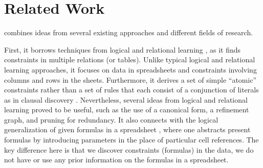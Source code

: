 \section{Related Work}\label{sec:related_work}
\sname combines ideas from several existing approaches and different fields of research.

First, it borrows techniques from logical and relational learning \cite{luc_book}, as it finds
constraints in multiple relations (or tables). Unlike typical logical and relational learning
approaches, it focuses on data in spreadsheets and constraints involving columns and rows in the sheets.
Furthermore, it derives a set of simple ``atomic'' constraints rather than a set of rules that each consist of a conjunction of literals as in clausal discovery \cite{claudien,lallouet}. Nevertheless, several ideas from logical and relational learning
proved to be useful, such as the use of a canonical form, a refinement graph, and pruning for redundancy. It also connects with the logical generalization of given formulas in a spreadsheet \cite{Isakowitz}, where one abstracts present formulas by introducing parameters in the place of particular cell references. The key difference here is that we discover constraints (formulas) in the data, we do not have or use any prior information on the formulas in a spreadsheet.


